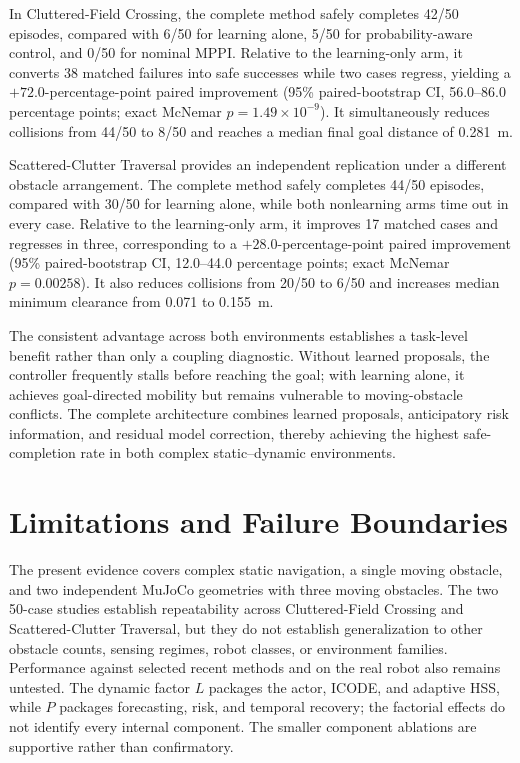 \documentclass[conference]{IEEEtran}
\begin{document}
In Cluttered-Field Crossing, the complete method safely completes 42/50
episodes, compared with 6/50 for learning alone, 5/50 for probability-aware
control, and 0/50 for nominal MPPI. Relative to the learning-only arm, it
converts 38 matched failures into safe successes while two cases regress,
yielding a $+72.0$-percentage-point paired improvement
(95\% paired-bootstrap CI, 56.0--86.0 percentage points;
exact McNemar $p=1.49\times10^{-9}$). It simultaneously reduces collisions
from 44/50 to 8/50 and reaches a median final goal distance of 0.281~m.

Scattered-Clutter Traversal provides an independent replication under a
different obstacle arrangement. The complete method safely completes 44/50
episodes, compared with 30/50 for learning alone, while both nonlearning
arms time out in every case. Relative to the learning-only arm, it improves
17 matched cases and regresses in three, corresponding to a
$+28.0$-percentage-point paired improvement
(95\% paired-bootstrap CI, 12.0--44.0 percentage points;
exact McNemar $p=0.00258$). It also reduces collisions from 20/50 to 6/50
and increases median minimum clearance from 0.071 to 0.155~m.

The consistent advantage across both environments establishes a task-level
benefit rather than only a coupling diagnostic. Without learned proposals,
the controller frequently stalls before reaching the goal; with learning
alone, it achieves goal-directed mobility but remains vulnerable to
moving-obstacle conflicts. The complete architecture combines learned
proposals, anticipatory risk information, and residual model correction,
thereby achieving the highest safe-completion rate in both complex
static--dynamic environments.

\FloatBarrier

\section{Limitations and Failure Boundaries}
\label{sec:limitations}

The present evidence covers complex static navigation, a single moving obstacle, and two independent MuJoCo geometries with three moving obstacles. The two 50-case studies establish repeatability across Cluttered-Field Crossing and Scattered-Clutter Traversal, but they do not establish generalization to other obstacle counts, sensing regimes, robot classes, or environment families. Performance against selected recent methods and on the real robot also remains untested. The dynamic factor $L$ packages the actor, ICODE, and adaptive HSS, while $P$ packages forecasting, risk, and temporal recovery; the factorial effects do not identify every internal component. The smaller component ablations are supportive rather than confirmatory.
\end{document}
